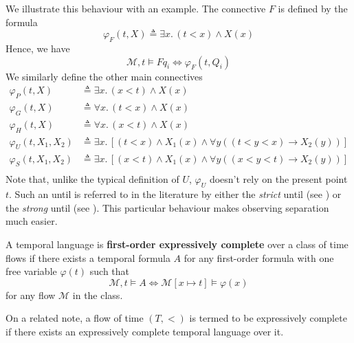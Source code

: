 \documentclass[a4paper,UKenglish,cleveref, autoref, thm-restate, numberwithinsect]{lipics-v2021}
\begin{document}
We illustrate this behaviour with an example. The connective $F$ is defined by the formula
\begin{equation*}
    \varphi_F(t, X) \triangleq \exists x.\, (t < x) \land X(x)
\end{equation*}
Hence, we have
\begin{equation*}
    \mathcal{M}, t \vDash F q_i \Longleftrightarrow \varphi_F(t, Q_i)
\end{equation*}
We similarly define the other main connectives
\begin{equation*}
    \begin{aligned}
        \varphi_P(t, X) &\triangleq \exists x.\, (x < t) \land X(x)\\
        \varphi_G(t, X) &\triangleq \forall x.\, (t < x) \land X(x)\\
        \varphi_H(t, X) &\triangleq \forall x.\, (x < t) \land X(x)\\
        \varphi_U(t, X_1, X_2) &\triangleq \exists x.\, \left[ \left( t < x \right) \land X_1(x) \land \forall y \left( \left( t < y < x \right) \to X_2(y) \right) \right]\\
        \varphi_S(t, X_1, X_2) &\triangleq \exists x.\, \left[ \left( x < t \right) \land X_1(x) \land \forall y \left( \left( x < y < t \right) \to X_2(y) \right) \right]\\
    \end{aligned}
\end{equation*}
Note that, unlike the typical definition of $U$, $\varphi_U$ doesn’t rely on the present point $t$. Such an until is referred to in the literature by either the \textit{strict} until (see \cite{gastinStrictUntil06}) or the \textit{strong} until (see \cite{BeCl16}). This particular behaviour makes observing separation much easier.

\begin{definition}
    \label{expressive-completeness-definition}
    A temporal language is \textbf{first-order expressively complete} over a class of time flows if there exists a temporal formula $A$ for any first-order formula with one free variable $\varphi(t)$ such that
\begin{equation*}
    \mathcal{M}, t \vDash A \Longleftrightarrow \mathcal{M}[x \mapsto t] \vDash \varphi(x)
\end{equation*}
    for any flow $\mathcal{M}$ in the class.
\end{definition}
On a related note, a flow of time $(T, <)$ is termed to be expressively complete if there exists an expressively complete temporal language over it.
\end{document}
